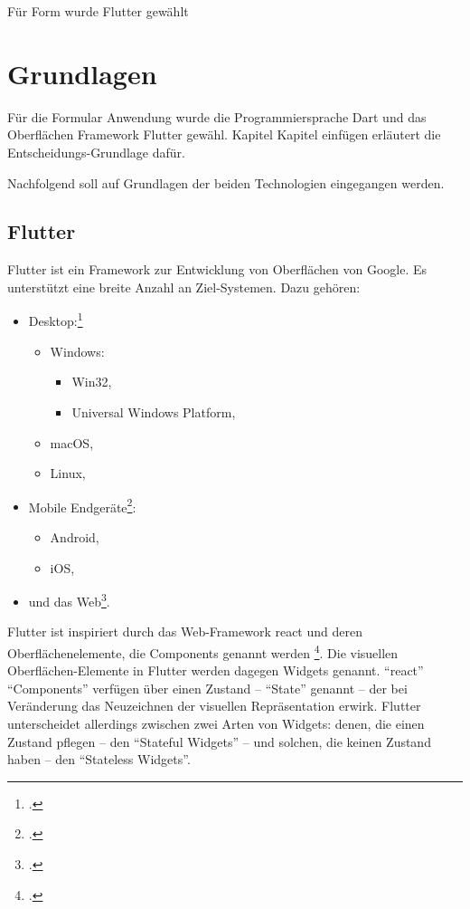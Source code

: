 
Für Form wurde Flutter gewählt

\section{Grundlagen}

Für die Formular Anwendung wurde die Programmiersprache Dart und das Oberflächen Framework Flutter gewähl.
Kapitel Kapitel einfügen  erläutert die Entscheidungs-Grundlage dafür.

Nachfolgend soll auf  Grundlagen der beiden Technologien eingegangen werden.

\subsection{Flutter}

Flutter ist ein Framework zur Entwicklung von Oberflächen von Google.
Es unterstützt eine breite Anzahl an Ziel-Systemen.
 Dazu gehören:

\begin{itemize}
  \item Desktop:\footcite[Vgl.][]{DesktopSupportForFlutter}
        \begin{itemize}
          \item Windows:
                \begin{itemize}
                  \item Win32,
                  \item Universal Windows Platform,
                \end{itemize}
          \item macOS,
          \item Linux,
        \end{itemize}
  \item Mobile Endgeräte\footcite[Vgl.][]{FlutterBeautifulNativeAppsInRecordTime}:
        \begin{itemize}
          \item Android,
          \item iOS,
        \end{itemize}
  \item und das Web\footcite[Vgl.][]{WebSupportForFlutter}.
\end{itemize}

Flutter ist inspiriert durch das Web-Framework react und deren Oberflächenelemente, die Components genannt werden \footcite[Vgl.][]{IntroductionToWidgets}.
Die visuellen Oberflächen-Elemente in Flutter werden dagegen Widgets genannt.
\enquote{react} \enquote{Components} verfügen über einen Zustand – \enquote{State} genannt – der bei Veränderung das Neuzeichnen der visuellen Repräsentation erwirk.
Flutter unterscheidet allerdings zwischen zwei Arten von Widgets: denen, die einen Zustand pflegen – den \enquote{Stateful Widgets} – und solchen, die keinen Zustand haben – den \enquote{Stateless Widgets}.

